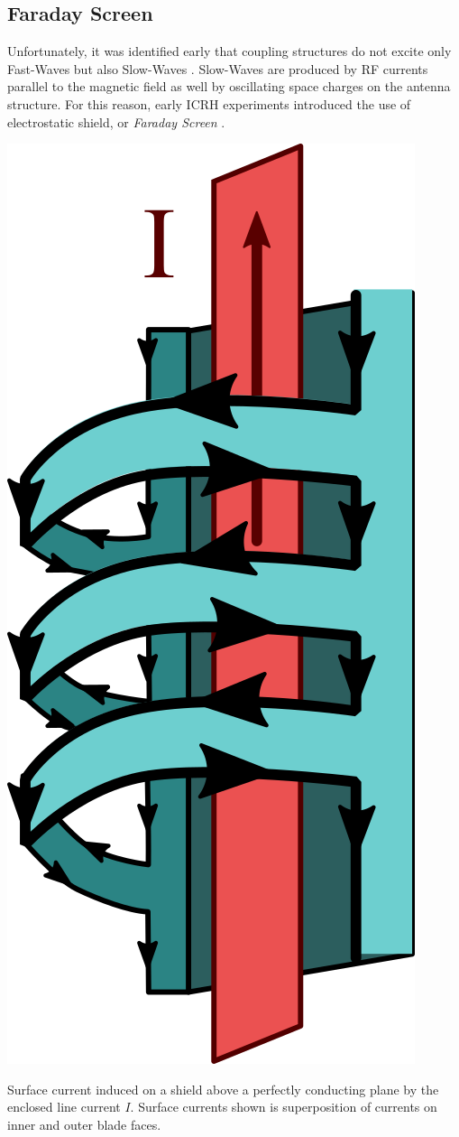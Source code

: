 
\subsection{Faraday Screen}
Unfortunately, it was identified early that coupling structures do not excite only Fast-Waves but also Slow-Waves . Slow-Waves are produced by RF currents parallel to the magnetic field as well by oscillating space charges on the antenna structure. For this reason, early ICRH experiments introduced the use of electrostatic shield, or \textit{Faraday Screen} . 

\begin{marginfigure}[-0.5cm]
	\includegraphics[width=0.5\linewidth]{figures/chap3/WEST_ICRH/ICRH_Faraday_Screen_Principle}
	\caption{Surface current induced on a shield above a perfectly conducting plane by the enclosed line current $I$. Surface currents shown is superposition of currents on inner and outer blade faces.}
	\label{fig:icrhfaradayscreenprinciple}
\end{marginfigure}

